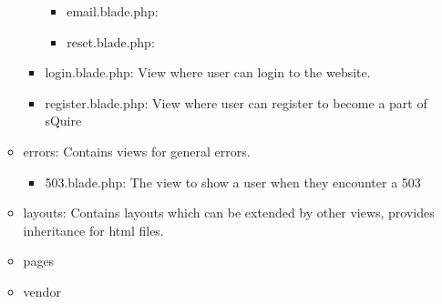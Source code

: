 \begin{itemize}
\begin{itemize}
\begin{itemize}
\begin{itemize}
                \item email.blade.php:
                \item reset.blade.php:
            \end{itemize}
            \item login.blade.php: View where user can login to the website.
            \item register.blade.php: View where user can register to become a part of sQuire
        \end{itemize}
        \item errors: Contains views for general errors.
        \begin{itemize}
            \item 503.blade.php: The view to show a user when they encounter a 503
        \end{itemize}
        \item layouts: Contains layouts which can be extended by other views, provides inheritance for html files.
        \item pages
        \item vendor
    \end{itemize}
\end{itemize}

